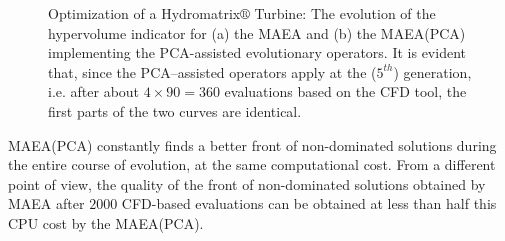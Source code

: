 \begin{figure}[h!]
\begin{minipage}[b]{1\linewidth}
 \centering
\end{minipage}
\caption{Optimization of a Hydromatrix$\circledR$ Turbine: The evolution of the hypervolume indicator for (a) the MAEA and (b) the MAEA(PCA) implementing the PCA-assisted evolutionary operators. It is evident that, since the PCA--assisted operators apply at the ($5^{th}$) generation, i.e. after about $4\!\times\!90\!=\!360$ evaluations based on the CFD tool, the first parts of the two curves are identical.}
\label{hyp_matrix}
\end{figure}
 
MAEA(PCA) constantly finds a better front of non-dominated solutions during the entire course of evolution, at the same computational cost. From a different point of view, the quality of the front of non-dominated solutions obtained by MAEA after $2000$ CFD-based evaluations can be  obtained at less than half this CPU cost by the MAEA(PCA). 

